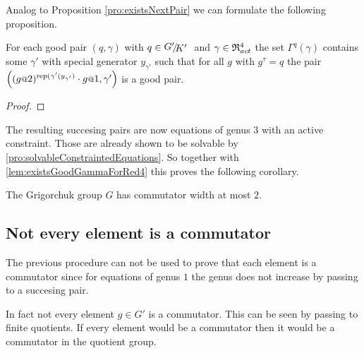 \documentclass[a4paper,12pt]{article}
\begin{document}
Analog to Proposition \ref{pro:existsNextPair} we can formulate the following proposition.
\begin{pro}\label{pro:existsNextPair}
 For each good pair $(q,\gamma)$ with $q\in\RNK{G'}{K'}$ and $\gamma\in\mathfrak{R}^4_{act}$ the set $\Gamma^q(\gamma)$ 
 contains some $\gamma'$ with special generator $y_{\gamma'}$ such that for all $g$ with $g^\tau=q$ the
 pair $\left((g\at{2})^{\textup{rep}(\gamma'(y_{\gamma'})}\cdot g\at{1},\gamma'\right)$ is a good pair.
\end{pro}
\begin{proof}
\end{proof}
The resulting succesing pairs are now equations of genus $3$ with an active constraint. Those are already shown to be solvable 
by \ref{pro:solvableConstraintedEquations}. So together with \ref{lem:existsGoodGammaForRed4} this proves the following corollary.
\begin{cor}
 The Grigorchuk group $G$ has commutator width at most $2$.
\end{cor}
\subsection{Not every element is a commutator}
The previous procedure can not be used to prove that each element is a commutator since for equations of genus $1$ the 
genus does not increase by passing to a succesing pair. 

In fact not every element $g\in G'$ is a commutator. This can be seen by passing to finite quotients. If every element would be a commutator then
it would be a commutator in the quotient group. 
% 
% 
\end{document}
